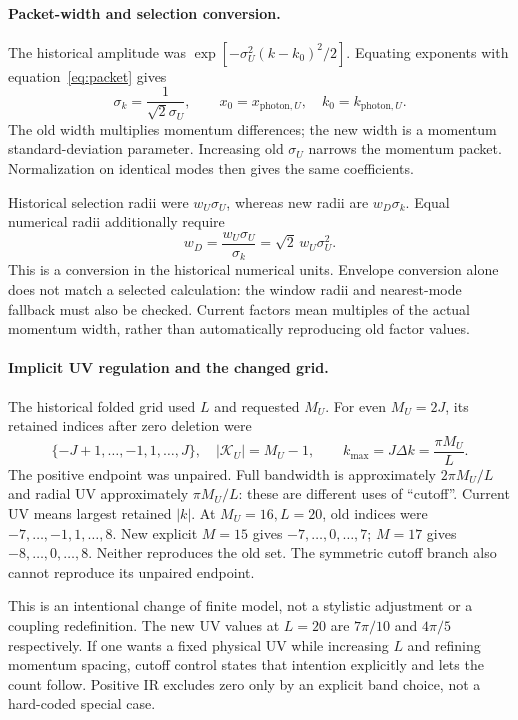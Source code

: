 \documentclass[11pt,a4paper]{article}
\newcommand{\K}{\mathcal K}
\begin{document}
\paragraph{Packet-width and selection conversion.}
The historical amplitude was $\exp[-\sigma_U^2(k-k_0)^2/2]$.
Equating exponents with equation~\eqref{eq:packet} gives
\begin{equation}
 \sigma_k=\frac1{\sqrt2\sigma_U},\qquad
 x_0=x_{\mathrm{photon},U},\quad k_0=k_{\mathrm{photon},U}.
 \label{eq:width}
\end{equation}
The old width multiplies momentum differences; the new width is a momentum
standard-deviation parameter. Increasing old $\sigma_U$ narrows the momentum
packet. Normalization on identical modes then gives the same coefficients.

Historical selection radii were $w_U\sigma_U$, whereas new radii are
$w_D\sigma_k$. Equal numerical radii additionally require
\begin{equation}
 w_D=\frac{w_U\sigma_U}{\sigma_k}=\sqrt2\,w_U\sigma_U^2.
 \label{eq:windowconversion}
\end{equation}
This is a conversion in the historical numerical units. Envelope conversion
alone does not match a selected calculation: the window radii and nearest-mode
fallback must also be checked. Current factors mean multiples of the actual
momentum width, rather than automatically reproducing old factor values.

\paragraph{Implicit UV regulation and the changed grid.}
The historical folded grid used $L$ and requested $M_U$. For even
$M_U=2J$, its retained indices after zero deletion were
\begin{equation}
 \{-J+1,\ldots,-1,1,\ldots,J\},\quad |\K_U|=M_U-1,
 \qquad k_{\max}=J\Delta k=\frac{\pi M_U}{L}.
 \label{eq:oldgrid}
\end{equation}
The positive endpoint was unpaired. Full bandwidth is approximately
$2\pi M_U/L$ and radial UV approximately $\pi M_U/L$: these are different
uses of ``cutoff''. Current UV means largest retained $|k|$.
At $M_U=16,L=20$, old indices were $-7,\ldots,-1,1,\ldots,8$.
New explicit $M=15$ gives $-7,\ldots,0,\ldots,7$; $M=17$ gives
$-8,\ldots,0,\ldots,8$. Neither reproduces the old set. The symmetric
cutoff branch also cannot reproduce its unpaired endpoint.

This is an intentional change of finite model, not a stylistic adjustment
or a coupling redefinition. The new UV values at $L=20$ are $7\pi/10$ and
$4\pi/5$ respectively. If one wants a fixed physical UV while increasing
$L$ and refining momentum spacing, cutoff control states that intention
explicitly and lets the count follow. Positive IR excludes zero only by an
explicit band choice, not a hard-coded special case.
\end{document}
